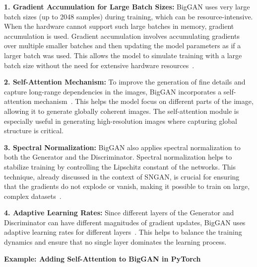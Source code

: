 \textbf{1. Gradient Accumulation for Large Batch Sizes:}  
BigGAN uses very large batch sizes (up to 2048 samples) during training, which can be resource-intensive. When the hardware cannot support such large batches in memory, gradient accumulation is used. Gradient accumulation involves accumulating gradients over multiple smaller batches and then updating the model parameters as if a larger batch was used. This allows the model to simulate training with a large batch size without the need for extensive hardware resources~\cite{brock2018large}.

\textbf{2. Self-Attention Mechanism:}  
To improve the generation of fine details and capture long-range dependencies in the images, BigGAN incorporates a self-attention mechanism~\cite{vaswani2017attention}. This helps the model focus on different parts of the image, allowing it to generate globally coherent images. The self-attention module is especially useful in generating high-resolution images where capturing global structure is critical.

\textbf{3. Spectral Normalization:}  
BigGAN also applies spectral normalization to both the Generator and the Discriminator. Spectral normalization helps to stabilize training by controlling the Lipschitz constant of the networks. This technique, already discussed in the context of SNGAN, is crucial for ensuring that the gradients do not explode or vanish, making it possible to train on large, complex datasets~\cite{donahue2019large}.

\textbf{4. Adaptive Learning Rates:}  
Since different layers of the Generator and Discriminator can have different magnitudes of gradient updates, BigGAN uses adaptive learning rates for different layers~\cite{ma2019adaptive}. This helps to balance the training dynamics and ensure that no single layer dominates the learning process.

\textbf{Example: Adding Self-Attention to BigGAN in PyTorch}

